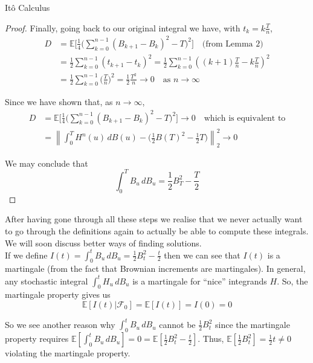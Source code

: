 \documentclass[12pt]{article}
\newcommand\norm[1]{\left\lVert#1\right\rVert} %
\newlength\tindent
\renewcommand{\indent}{\hspace*{\tindent}}
\begin{document}
\begin{section}{It\^{o} Calculus}
\begin{proof}
Finally, going back to our original integral we have, with $t_k = k\frac{T}{n}$,
\begin{align*}
	D &= \mathbb E\Bigg[\frac{1}{4}\Bigg(\sum^{n-1}_{k=0}(B_{k+1} - B_k)^2 - T\Bigg)^2\Bigg] \quad \text{(from Lemma 2)}\\
	&= \frac{1}{2}\sum^{n - 1}_{k = 0}(t_{k+1} - t_k)^2 = \frac{1}{2}\sum^{n-1}_{k = 0}((k+1)\frac{T}{n} - k\frac{T}{n})^2 \\
	&= \frac{1}{2}\sum^{n - 1}_{k = 0}\Big(\frac{T}{n}\Big)^2 = \frac{1}{2}\frac{T^2}{n} \longrightarrow 0 \quad \text{as $n\longrightarrow \infty$}
\end{align*}

Since we have shown that, as $n \longrightarrow \infty$,
\begin{align*}
	D &= \mathbb E\Bigg[\frac{1}{4}\Bigg(\sum^{n-1}_{k=0}(B_{k+1} - B_k)^2 - T\Bigg)^2\Bigg] \longrightarrow 0 \quad \text{which is equivalent to} \\
	&= \norm{\int^T_0 H^n(u)\,dB(u) - \Big(\frac{1}{2}B(T)^2 - \frac{1}{2}T\Big)}^2_2 \longrightarrow 0
\end{align*}

We may conclude that
\begin{equation*}
	\int^T_0 B_u\,dB_u = \frac{1}{2}B^2_T - \frac{T}{2}
\end{equation*}
\end{proof}

\indent After having gone through all these steps we realise that we never actually want to go through the definitions again to actually be able to compute these integrals. We will soon discuss better ways of finding solutions. \\

\indent If we define $I(t) = \int^t_0 B_u\,dB_u = \frac{1}{2}B^2_t - \frac{t}{2}$ then we can see that $I(t)$ is a martingale (from the fact that Brownian increments are martingales). In general, any stochastic integral $\int^t_0 H_u\,dB_u$ is a martingale for ``nice'' integrands $H$. So, the martingale property gives us
\begin{equation*}
	\mathbb E[I(t) | \mathcal F_0] = \mathbb E[I(t)] = I(0) = 0
\end{equation*}

\indent So we see another reason why $\int^t_0B_u\,dB_u$ cannot be $\frac{1}{2}B^2_t$ since the martingale property requires $\mathbb E[\int^t_0 B_u\,dB_u] = 0 = \mathbb E[\frac{1}{2}B_t^2 - \frac{t}{2}]$. Thus, $\mathbb E[\frac{1}{2}B^2_t] = \frac{1}{2}t \neq 0$ violating the martingale property. 


\end{section}
\end{document}
